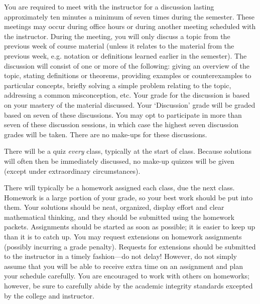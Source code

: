 \documentclass[11pt,letterpaper]{article}
\begin{document}
You are required to meet with the instructor for a discussion lasting approximately ten minutes a minimum of seven times during the semester. These meetings may occur during office hours or during another meeting scheduled with the instructor. During the meeting, you will only discuss a topic from the previous week of course material (unless it relates to the material from the previous week, e.g. notation or definitions learned earlier in the semester). The discussion will consist of one or more of the following: giving an overview of the topic, stating definitions or theorems, providing examples or counterexamples to particular concepts, briefly solving a simple problem relating to the topic, addressing a common misconception, etc. Your grade for the discussion is based on your mastery of the material discussed. Your `Discussion' grade will be graded based on seven of these discussions. You may opt to participate in more than seven of these discussion sessions, in which case the highest seven discussion grades will be taken. There are no make-ups for these discussions. 



\newpage



There will be a quiz \textit{every} class, typically at the start of class. Because solutions will often then be immediately discussed, no make-up quizzes will be given (except under extraordinary circumstances). \pspace


There will typically be a homework assigned each class, due the next class. Homework is a large portion of your grade, so your best work should be put into them. Your solutions should be neat, organized, display effort and clear mathematical thinking, and they should be submitted using the homework packets. Assignments should be started as soon as possible; it is easier to keep up than it is to catch up. You may request extensions on homework assignments (possibly incurring a grade penalty). Requests for extensions should be submitted to the instructor in a timely fashion---do not delay! However, do not simply assume that you will be able to receive extra time on an assignment and plan your schedule carefully. You are encouraged to work with others on homeworks; however, be sure to carefully abide by the academic integrity standards excepted by the college and instructor. \pspace
\end{document}
